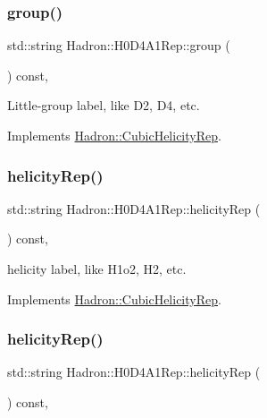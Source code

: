 \subsubsection{\texorpdfstring{group()}{group()}\hspace{0.1cm}{\footnotesize\ttfamily [5/5]}}
{\footnotesize\ttfamily std\+::string Hadron\+::\+H0\+D4\+A1\+Rep\+::group (\begin{DoxyParamCaption}{ }\end{DoxyParamCaption}) const\hspace{0.3cm}{\ttfamily [inline]}, {\ttfamily [virtual]}}

Little-\/group label, like D2, D4, etc. 

Implements \mbox{\hyperlink{structHadron_1_1CubicHelicityRep_a101a7d76cd8ccdad0f272db44b766113}{Hadron\+::\+Cubic\+Helicity\+Rep}}.

\mbox{\label{structHadron_1_1H0D4A1Rep_ae4478095b32b0fd6f52f60f7fd489e6d}} 
\subsubsection{\texorpdfstring{helicityRep()}{helicityRep()}\hspace{0.1cm}{\footnotesize\ttfamily [1/3]}}
{\footnotesize\ttfamily std\+::string Hadron\+::\+H0\+D4\+A1\+Rep\+::helicity\+Rep (\begin{DoxyParamCaption}{ }\end{DoxyParamCaption}) const\hspace{0.3cm}{\ttfamily [inline]}, {\ttfamily [virtual]}}

helicity label, like H1o2, H2, etc. 

Implements \mbox{\hyperlink{structHadron_1_1CubicHelicityRep_af1096946b7470edf0a55451cc662f231}{Hadron\+::\+Cubic\+Helicity\+Rep}}.

\mbox{\label{structHadron_1_1H0D4A1Rep_ae4478095b32b0fd6f52f60f7fd489e6d}} 
\subsubsection{\texorpdfstring{helicityRep()}{helicityRep()}\hspace{0.1cm}{\footnotesize\ttfamily [2/3]}}
{\footnotesize\ttfamily std\+::string Hadron\+::\+H0\+D4\+A1\+Rep\+::helicity\+Rep (\begin{DoxyParamCaption}{ }\end{DoxyParamCaption}) const\hspace{0.3cm}{\ttfamily [inline]}, {\ttfamily [virtual]}}

